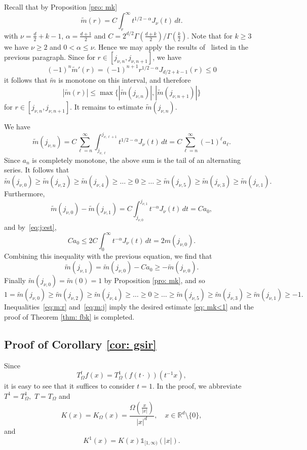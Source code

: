 \documentclass[a4paper,12pt,reqno]{amsart}
\numberwithin{equation}{section}
\theoremstyle{definition}
\newcommand{\ind}{\mathbb{1}}
\newcommand{\R}{\mathbb{R}}
\newcommand{\tm}{\tilde{m}}
\newcommand{\abs}[1]{\left\lvert #1 \right\rvert}
\renewcommand{\le}{\leqslant}
\renewcommand{\ge}{\geqslant}
\begin{document}
Recall that by Proposition \ref{pro: mk}
\[
  \tm(r) = C \int_r^\infty t^{1/2 - \alpha} J_\nu(t) \, dt.
\]
 with $\nu = \frac{d}{2} + k - 1$, $\alpha = \frac{d + 1}{2}$ and $C = 2^{d/2} \Gamma(\frac{d + k}{2}) / \Gamma(\frac{k}{2})$.
Note that for $k\ge 3$ we have $\nu \ge 2$   and $0 < \alpha \le \nu $.  Hence we may apply the results of~\cite{lms} listed in the previous paragraph. Since for $r \in [j_{\nu, n}, j_{\nu, n+ 1}]$, we have
\[
 (-1)^n \tm'(r) = (-1)^{n + 1} r^{1/2-\alpha}J_{d/2 + k - 1}(r) \le 0 
\]
it follows that $\tm$ is monotone on this interval, and therefore
\begin{equation}
\label{eq:m:r}
 |\tm(r)| \le \max \{|\tm(j_{\nu, n})|, |\tm(j_{\nu, n + 1})|\}
\end{equation}
for $r \in [j_{\nu, n}, j_{\nu, n + 1}]$. It remains to estimate $\tm(j_{\nu, n})$.

We have
\[
 \tm(j_{\nu, n}) = C \sum_{\ell = n}^\infty \int_{j_{\nu, \ell}}^{j_{\nu, \ell + 1}} t^{1/2 - \alpha} J_\nu(t) \, dt = C \sum_{\ell = n}^\infty (-1)^\ell a_{\ell}.
\]
Since $a_n$ is completely monotone, the above sum is the tail of an alternating series. It follows that
\[
 \tm(j_{\nu, 0}) \ge \tm(j_{\nu, 2}) \ge \tm(j_{\nu, 4}) \ge \ldots \ge 0 \ge \ldots \ge \tm(j_{\nu, 5}) \ge \tm(j_{\nu, 3}) \ge \tm(j_{\nu, 1}) .
\]
Furthermore,
\[
 \tm(j_{\nu, 0}) - \tm(j_{\nu, 1}) = C \int_{j_{\nu, 0}}^{j_{\nu, 1}} t^{-\alpha} J_\nu(t) \, dt = C a_0 ,
\]
and by~\eqref{eq:j:est},
\[
 C a_0 \le 2 C \int_0^\infty t^{-\alpha} J_\nu(t) \, dt = 2 m(j_{\nu, 0}) .
\]
Combining this inequality with the previous equation, we find that
\[
 \tm(j_{\nu, 1}) = \tm(j_{\nu, 0}) - C a_0 \ge -\tm(j_{\nu, 0}) .
\]
Finally $\tm(j_{\nu, 0}) = \tm(0) = 1$ by Proposition \ref{pro: mk}, and so
\begin{equation}
\label{eq:m:j}
 1 = \tm(j_{\nu, 0}) \ge \tm(j_{\nu, 2}) \ge \tm(j_{\nu, 4}) \ge \ldots \ge 0 \ge \ldots \ge \tm(j_{\nu, 5}) \ge \tm(j_{\nu, 3}) \ge \tm(j_{\nu, 1}) \ge -1 .
\end{equation}
Inequalities~\eqref{eq:m:r} and~\eqref{eq:m:j} imply the desired estimate \eqref{eq: mk<1} and the proof of Theorem \ref{thm: fbk} is completed.


\subsection{Proof of Corollary \ref{cor: gsir}}
Since 
\[T_{\Omega}^t f(x)=T_{\Omega}^1 ( f(t\cdot))(t^{-1}x),\] it is easy to see that it suffices to consider $t=1.$ In the proof, we abbreviate $T^1=T_{\Omega}^1,$ $T=T_{\Omega}$ and
\[
	K(x) =K_{\Omega}(x)= \frac{\Omega(\frac{x}{\abs{x}})}{\abs{x}^d}, \quad x \in \R^d \setminus \{0\},
\]
and
\[
	K^1(x) = K(x) \ind_{[1,\infty)}(|x|).
\]
\end{document}
